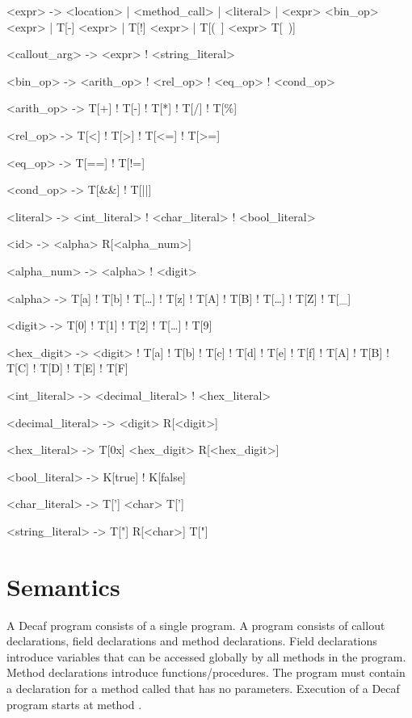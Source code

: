 \begin{bnfgrammar}
<expr> -> <location>
        | <method_call>
        | <literal>
        | <expr> <bin_op> <expr>
        | T[-] <expr>
        | T[!] <expr>
        | T[(~] <expr> T[~)]

<callout_arg> -> <expr> ! <string_literal>

<bin_op> -> <arith_op> ! <rel_op> ! <eq_op> ! <cond_op>

<arith_op> -> T[+] ! T[-] ! T[*] ! T[/] ! T[\%] %

<rel_op> -> T[<] ! T[>] ! T[<=] ! T[>=]

<eq_op>   -> T[==] ! T[!=]

<cond_op> -> T[\&\&] ! T[||]

<literal> -> <int_literal> ! <char_literal> ! <bool_literal>

<id> -> <alpha> R[<alpha_num>]

<alpha_num> -> <alpha> ! <digit>

<alpha> -> T[a] ! T[b] ! T[\ldots{}] ! T[z] ! T[A] ! T[B] ! T[\ldots{}] ! T[Z] ! T[\_]

<digit> -> T[0] ! T[1] ! T[2] ! T[\ldots] ! T[9]

<hex_digit> -> <digit> ! T[a] ! T[b] ! T[c] ! T[d] ! T[e] ! T[f] ! T[A] ! T[B] ! T[C] ! T[D] ! T[E] ! T[F]

<int_literal> -> <decimal_literal> ! <hex_literal>

<decimal_literal> -> <digit> R[<digit>]

<hex_literal> -> T[0x] <hex_digit> R[<hex_digit>]

<bool_literal> -> K[true] ! K[false]

<char_literal> -> T['] <char> T[']

<string_literal> -> T["] R[<char>] T["]
\end{bnfgrammar}

\section*{Semantics}
\def\arrayint{\kw{array}\term{\[\kw{int}\]}}
\def\arraybool{\kw{array}\term{\[\kw{bool}\]}}
\def\arrayT{\kw{array}\term{\[T\]}}

A Decaf program consists of a single program. A program consists of callout declarations,
field declarations and method declarations.  Field declarations
introduce variables that can be accessed globally by all methods in
the program.  Method declarations introduce functions/procedures.  The
program must contain a declaration for a method called  that
has no parameters.  Execution of a Decaf program starts
at method .

